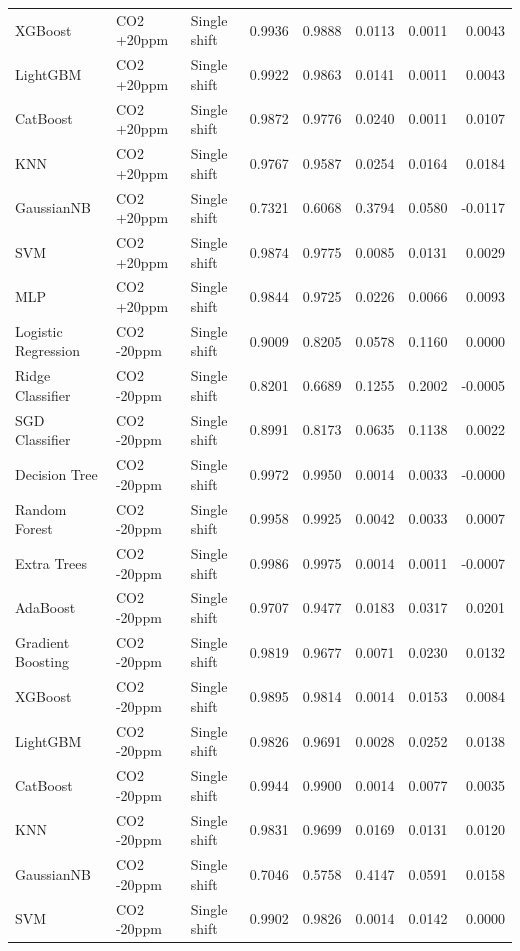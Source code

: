 \begin{tabular}{lllrrrrr}
XGBoost & CO2 +20ppm & Single shift & 0.9936 & 0.9888 & 0.0113 & 0.0011 & 0.0043 \\
LightGBM & CO2 +20ppm & Single shift & 0.9922 & 0.9863 & 0.0141 & 0.0011 & 0.0043 \\
CatBoost & CO2 +20ppm & Single shift & 0.9872 & 0.9776 & 0.0240 & 0.0011 & 0.0107 \\
KNN & CO2 +20ppm & Single shift & 0.9767 & 0.9587 & 0.0254 & 0.0164 & 0.0184 \\
GaussianNB & CO2 +20ppm & Single shift & 0.7321 & 0.6068 & 0.3794 & 0.0580 & -0.0117 \\
SVM & CO2 +20ppm & Single shift & 0.9874 & 0.9775 & 0.0085 & 0.0131 & 0.0029 \\
MLP & CO2 +20ppm & Single shift & 0.9844 & 0.9725 & 0.0226 & 0.0066 & 0.0093 \\
Logistic Regression & CO2 -20ppm & Single shift & 0.9009 & 0.8205 & 0.0578 & 0.1160 & 0.0000 \\
Ridge Classifier & CO2 -20ppm & Single shift & 0.8201 & 0.6689 & 0.1255 & 0.2002 & -0.0005 \\
SGD Classifier & CO2 -20ppm & Single shift & 0.8991 & 0.8173 & 0.0635 & 0.1138 & 0.0022 \\
Decision Tree & CO2 -20ppm & Single shift & 0.9972 & 0.9950 & 0.0014 & 0.0033 & -0.0000 \\
Random Forest & CO2 -20ppm & Single shift & 0.9958 & 0.9925 & 0.0042 & 0.0033 & 0.0007 \\
Extra Trees & CO2 -20ppm & Single shift & 0.9986 & 0.9975 & 0.0014 & 0.0011 & -0.0007 \\
AdaBoost & CO2 -20ppm & Single shift & 0.9707 & 0.9477 & 0.0183 & 0.0317 & 0.0201 \\
Gradient Boosting & CO2 -20ppm & Single shift & 0.9819 & 0.9677 & 0.0071 & 0.0230 & 0.0132 \\
XGBoost & CO2 -20ppm & Single shift & 0.9895 & 0.9814 & 0.0014 & 0.0153 & 0.0084 \\
LightGBM & CO2 -20ppm & Single shift & 0.9826 & 0.9691 & 0.0028 & 0.0252 & 0.0138 \\
CatBoost & CO2 -20ppm & Single shift & 0.9944 & 0.9900 & 0.0014 & 0.0077 & 0.0035 \\
KNN & CO2 -20ppm & Single shift & 0.9831 & 0.9699 & 0.0169 & 0.0131 & 0.0120 \\
GaussianNB & CO2 -20ppm & Single shift & 0.7046 & 0.5758 & 0.4147 & 0.0591 & 0.0158 \\
SVM & CO2 -20ppm & Single shift & 0.9902 & 0.9826 & 0.0014 & 0.0142 & 0.0000 \\

\end{tabular}
